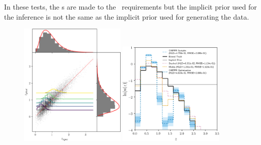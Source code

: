 In these tests, the \pzip s are made to the \lsst\ requirements but the implicit prior used for the inference is not the same as the implicit prior used for generating the data.

\begin{figure}
	\begin{center}
		\includegraphics[width=0.45\textwidth]{figures/chippr/wrong_scatter.png}
		\includegraphics[width=0.45\textwidth]{figures/chippr/wrong_log_estimators.png}
		\caption{}
	\end{center}
\end{figure}

%

